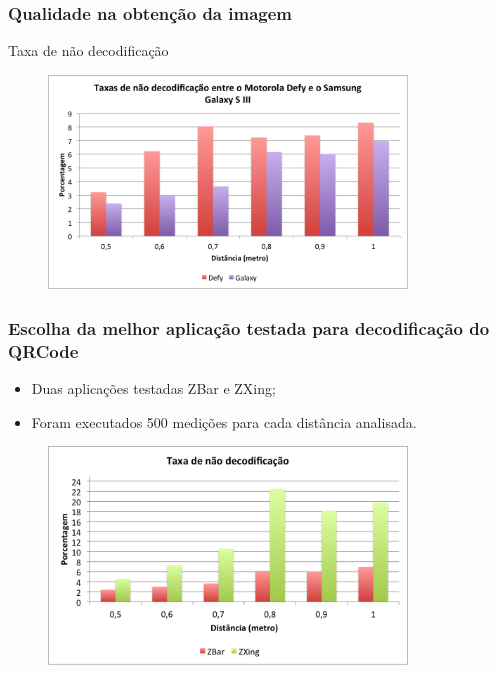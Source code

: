 \documentclass{beamer}
\begin{document}
	\begin{frame}
		\frametitle{Qualidade na obtenção da imagem}
		
		Taxa de não decodificação
		
		\begin{figure}[htb]
			\begin{center}
					\includegraphics[width=0.85\textwidth]{figuras/taxa_decodificacao_qualidade.png}
			\end{center}
		\end{figure}
	\end{frame}
	
	
	\begin{frame}
		\frametitle{Escolha da melhor aplicação testada para decodificação do QRCode}
		
		\begin{itemize}
		  \item Duas aplicações testadas ZBar e ZXing;
		  \item Foram executados 500 medições para cada distância analisada. 
		\end{itemize}
		
		 \begin{figure}[htb]
			\begin{center}
					\includegraphics[width=0.85\textwidth]{figuras/grafico_suporte.png}
			\end{center}
		\end{figure}
	\end{frame}
	
\end{document}
